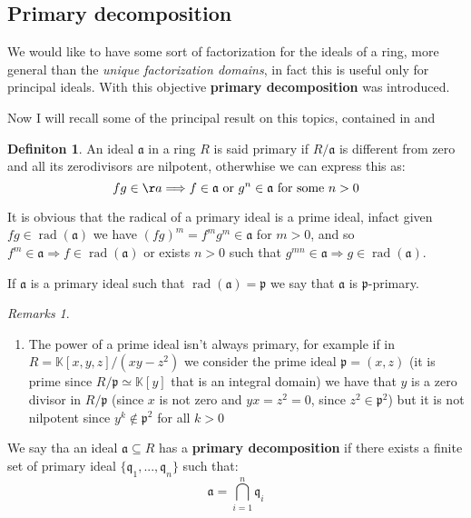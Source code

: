 \documentclass[]{article}
\theoremstyle{plain}
\theoremstyle{remark}
\newtheorem{rems}[rem]{Remarks}
\theoremstyle{definition}
\newtheorem{deff}[teo]{Definiton}
\newcommand{\K}{\mathbb{K}}
\newcommand{\p}{\mathfrak{p}}
\newcommand{\q}{\mathfrak{q}}
\newcommand{\A}{\mathfrak{a}}
\DeclareMathOperator{\rad}{rad}
\begin{document}
\subsection{Primary decomposition}

We would like to have some sort of factorization for the ideals of a ring, more general than the \textit{unique factorization domains}, in fact this is useful only for principal ideals. With this objective \textbf{primary decomposition} was introduced. 

Now I will recall some of the principal result on this topics, contained in \cite[Section 7]{Reid} and \cite[Section 4 and Page 83]{AMCD}

\begin{deff}
	An ideal $ \A $ in a ring $ R $ is said primary if $ R/\A$ is different from zero and all its zerodivisors are nilpotent, otherwhise we can express this as:
	\begin{equation*}
		fg \in \aa \Longrightarrow f \in \A \text{ or } g^n \in \A \text{ for some } n >0
	\end{equation*}
\end{deff}

It is obvious that the radical of a primary ideal is a prime ideal, infact given $ fg \in \rad(\A)  $ we have $ (fg)^m = f^m g^m \in \A $ for $ m>0 $, and so $ f^m \in \A \Rightarrow f \in \rad(\A)$ or exists $ n>0 $ such that $ g^{mn} \in \A \Rightarrow g \in \rad(\A) $.

If $ \A $ is a primary ideal such that $ \rad(\A) = \p $ we say that $ \A $ is {$ \p $-primary}.

\begin{rems} \label{rem:power_primary} \quad 
	\begin{enumerate}
	\item The power of a prime ideal isn't always primary, for example if in $ R = \K[x,y,z] / (xy - z^2) $ we consider the prime ideal $ \p = (x,z) $ (it is prime since $ R / \p \simeq \K[y]$ that is an integral domain) we have that $ y $ is a zero divisor in $R/\p $ (since $ x $ is not zero and $ yx = z^2 = 0 $, since $z^2 \in \p^2 $) but it is not nilpotent since $ y^k \not \in \p^2 $ for all $ k>0 $
	\end{enumerate}
\end{rems}

We say tha an ideal $ \A \subseteq R $ has a \textbf{primary decomposition}  if there exists a finite set of primary ideal $ \{ \q_1 , ... , \q_n\} $ such that:
\begin{equation*}
	\A = \bigcap_{i=1}^n \q_i
\end{equation*}
\end{document}
